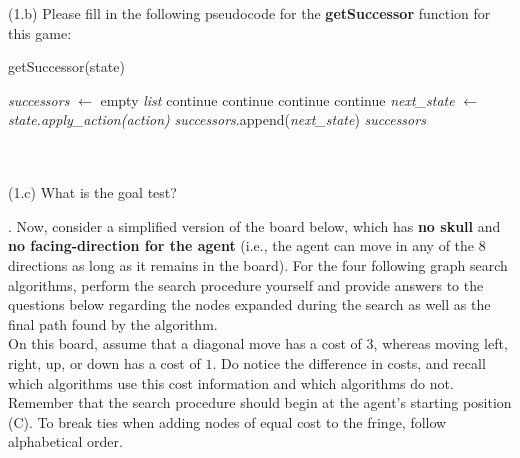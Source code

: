 \documentclass{article}
\begin{document}
\noindent (1.b) Please fill in the following pseudocode for the \textbf{getSuccessor} function for this game:
\begin{algorithm}[thb!]
\caption{getSuccessor(state)}
\begin{algorithmic}[1]
\STATE \textit{successors} $\gets$ empty \textit{list}
		\STATE continue
	\ENDIF
		\STATE continue
	\ENDIF
		\STATE continue
	\ENDIF
		\STATE continue
	\ENDIF
	\STATE \textit{next\_state} $\gets$ \textit{state.apply\_action(action)}
		\STATE \textit{successors}.append(\textit{next\_state})
	\ENDIF
\ENDFOR
\RETURN \textit{successors}
\end{algorithmic}
\end{algorithm}
~\\
~\\

\noindent (1.c) What is the goal test?


\newpage
{}. Now, consider a simplified version of the board below, which has \textbf{no skull} and \textbf{no facing-direction for the agent} (i.e., the agent can move in any of the $8$ directions as long as it remains in the board). For the four following graph search algorithms, perform the search procedure yourself and provide answers to the questions below regarding the nodes expanded during the search as well as the final path found by the algorithm.\\

\noindent On this board, assume that a diagonal move has a cost of $3$, whereas moving left, right, up, or down has a cost of $1$. Do notice the difference in costs, and recall which algorithms use this cost information and which algorithms do not.\\

\noindent Remember that the search procedure should begin at the agent’s starting position (C). To break ties when adding nodes of equal cost to the fringe, follow alphabetical order. \\
\end{document}
